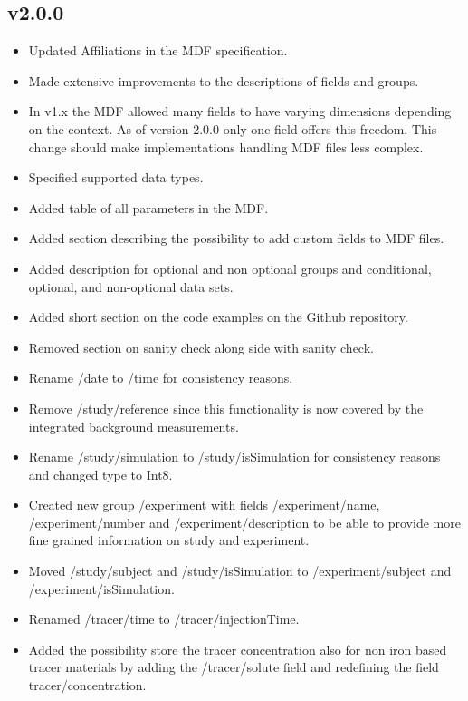 \documentclass[landscape,a4paper]{article} %
\newcommand{\inlvar}[1]{{\ttfamily#1}}
\begin{document}
\begin{multicols}{2}
\subsection{v2.0.0}

\begin{itemize}
	\item Updated Affiliations in the MDF specification.
	\item Made extensive improvements to the descriptions of fields and groups.
	\item  In v1.x the MDF allowed many fields to have varying dimensions depending on the context. As of version 2.0.0 only one field offers this freedom. This change should make implementations handling MDF files less complex.
	\item Specified supported data types.
	\item Added table of all parameters in the MDF.
	\item Added section describing the possibility to add custom fields to MDF files.
	\item Added description for optional and non optional groups and conditional, optional, and non-optional data sets.
    \item Added short section on the code examples on the Github repository.		
 	\item Removed section on sanity check along side with sanity check.
	\item Rename \inlvar{/date} to \inlvar{/time} for consistency reasons.
	\item Remove \inlvar{/study/reference} since this functionality is now covered by the integrated background measurements.
	\item Rename \inlvar{/study/simulation} to \inlvar{/study/isSimulation} for consistency reasons and changed type to \inlvar{Int8}.
	\item Created new group \inlvar{/experiment} with fields \inlvar{/experiment/name}, \inlvar{/experiment/number} and \inlvar{/experiment/description} to be able to provide more fine grained information on study and experiment.
	\item Moved \inlvar{/study/subject} and \inlvar{/study/isSimulation} to \inlvar{/experiment/subject} and \inlvar{/experiment/isSimulation}.
	\item Renamed \inlvar{/tracer/time} to \inlvar{/tracer/injectionTime}.
	\item Added the possibility store the tracer concentration also for non iron based tracer materials by adding the \inlvar{/tracer/solute} field and redefining the field \inlvar{tracer/concentration}.

\end{itemize}
\end{multicols}
\end{document}
